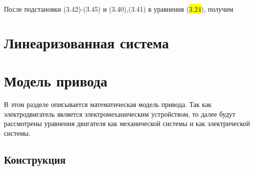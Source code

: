 После подстановки (3.42)-(3.45) и (3.40),(3.41) в уравнения (\colorbox{Yellow}{3.24}), получим\par




\section{Линеаризованная система} \label{ch:ch3/sect10}

\section{Модель привода} \label{ch:ch3/sect9}

В этом разделе описывается математическая модель привода. Так как электродвигатель является электромеханическим устройством, то далее будут рассмотрены уравнения двигателя как механической системы и как электрической системы.

\subsection{Конструкция} \label{sec:ch3/sec9/sub1}


